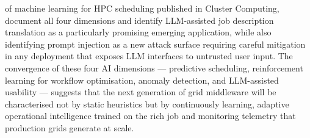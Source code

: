 \documentclass[12pt,a4paper]{report}
\begin{document}
      of machine learning for HPC scheduling published in Cluster Computing, document all four dimensions and identify LLM-assisted job description
       translation as a particularly promising emerging application, while also identifying prompt injection as a new attack surface requiring careful
        mitigation in any deployment that exposes LLM interfaces to untrusted user input. The convergence of these four AI dimensions — predictive 
        scheduling, reinforcement learning for workflow optimisation, anomaly detection, and LLM-assisted usability — suggests that the next generation 
        of grid middleware will be characterised not by static heuristics but by continuously learning, adaptive operational intelligence trained on the 
        rich job and monitoring telemetry that production grids generate at scale.
\end{document}
